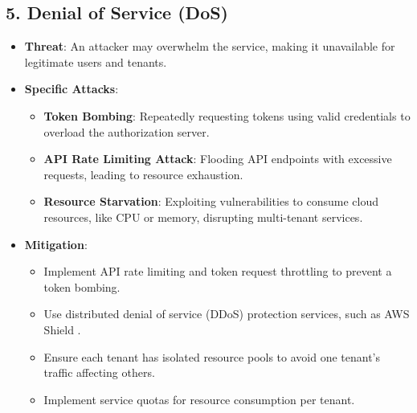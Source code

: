 \subsection*{5. Denial of Service (DoS)}
\begin{itemize}
    \item \textbf{Threat}: An attacker may overwhelm the service, making it unavailable for legitimate users and tenants.
    \item \textbf{Specific Attacks}:
    \begin{itemize}
        \item \textbf{Token Bombing}: Repeatedly requesting tokens using valid credentials to overload the authorization server.
        \item \textbf{API Rate Limiting Attack}: Flooding API endpoints with excessive requests, leading to resource exhaustion.
        \item \textbf{Resource Starvation}: Exploiting vulnerabilities to consume cloud resources, like CPU or memory, disrupting multi-tenant services.
    \end{itemize}
    \item \textbf{Mitigation}:
    \begin{itemize}
        \item Implement API rate limiting and token request throttling to prevent a token bombing.
        \item Use distributed denial of service (DDoS) protection services, such as AWS Shield \citep{aws_shield}.
        \item Ensure each tenant has isolated resource pools to avoid one tenant's traffic affecting others.
        \item Implement service quotas for resource consumption per tenant.
    \end{itemize}
\end{itemize}


